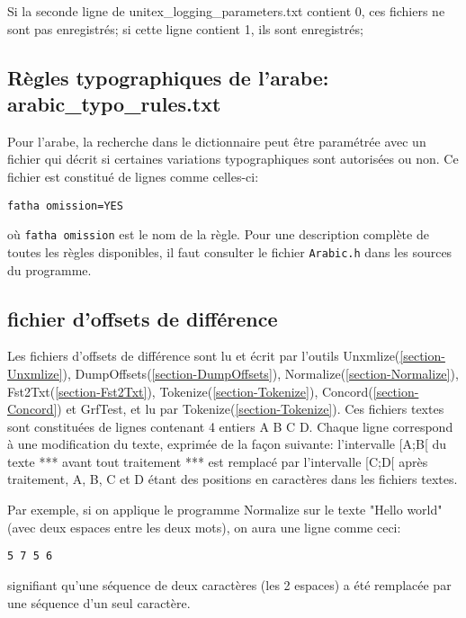 Si la seconde ligne de unitex\_logging\_parameters.txt contient 0, ces fichiers ne sont pas
enregistrés; si cette ligne contient 1, ils sont enregistrés;

\subsection{Règles typographiques de l'arabe: arabic\_typo\_rules.txt}
\label{subsection-arabic-typo-rules}
Pour l'arabe, la recherche dans le dictionnaire peut être paramétrée avec un fichier qui décrit si
certaines variations typographiques sont autorisées ou non. Ce fichier est constitué de lignes comme
celles-ci:

\bigskip
\noindent \verb+fatha omission=YES+

\bigskip
\noindent où \verb+fatha omission+ est le nom de la règle. Pour une description complète de toutes
les règles disponibles, il faut consulter le fichier \verb+Arabic.h+ dans les sources du programme.

\subsection{fichier d'offsets de différence}
\label{subsection-offsets-diff}

Les fichiers d'offsets de différence sont lu et écrit par l'outils Unxmlize(\ref{section-Unxmlize}), DumpOffsets(\ref{section-DumpOffsets}), Normalize(\ref{section-Normalize}), Fst2Txt(\ref{section-Fst2Txt}), Tokenize(\ref{section-Tokenize}), Concord(\ref{section-Concord}) et GrfTest, et lu par Tokenize(\ref{section-Tokenize}).
\bigskip
Ces fichiers textes sont constituées de lignes contenant 4 entiers A B C D. Chaque ligne correspond à une modification du texte, exprimée de la façon suivante:
\bigskip
l'intervalle [A;B[ du texte *** avant tout traitement *** est remplacé par l'intervalle [C;D[ après traitement, A, B, C et D étant des positions en caractères dans les fichiers textes.
\bigskip

Par exemple, si on applique le programme Normalize sur le texte "Hello  world" (avec deux espaces entre les deux mots), on aura une ligne comme ceci:

\bigskip
\noindent \verb+5 7 5 6+
\bigskip

signifiant qu'une séquence de deux caractères (les 2 espaces) a été remplacée par une séquence d'un seul caractère.

